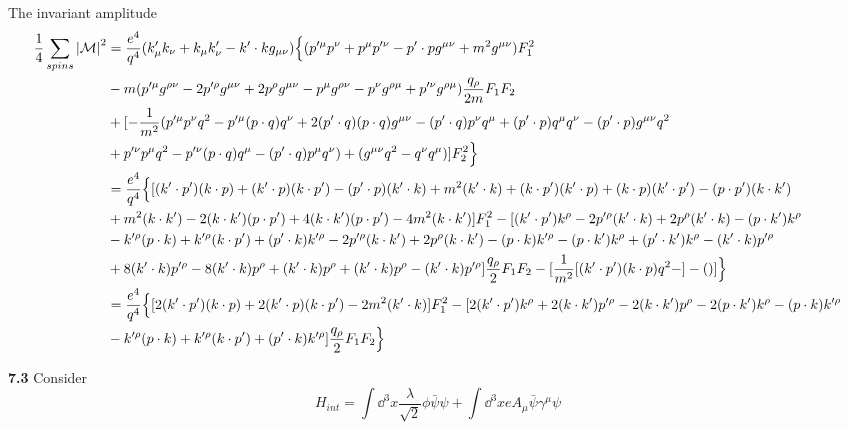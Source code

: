 \documentclass{article}
\newcommand{\gm}{\gamma^{\mu}} \newcommand{\gn}{\gamma^{\nu}}
\newcommand{\la}{\lambda} \newcommand{\p}{\phi} \newcommand{\vp}{\varphi}
\begin{document}
The invariant amplitude
\begin{align*}
  \frac{1}{4}\sum_{spins}\abs{\mathcal{M}}^2&=\frac{e^4}{q^4}(k'_{\mu}k_{\nu}+k_{\mu}k'_{\nu}-k'\cdot kg_{\mu\nu})\Big\{(p'^{\mu}p^{\nu}+p^{\mu}p'^{\nu}-p'\cdot pg^{\mu\nu}+m^2g^{\mu\nu})F_1^2\\
  &-m(p'^{\mu}g^{\rho\nu}-2p'^{\rho}g^{\mu\nu}+2p^{\rho}g^{\mu\nu}-p^{\mu}g^{\rho\nu}-p^{\nu}g^{\rho\mu}+p'^{\nu}g^{\rho\mu})\frac{q_{\rho}}{2m}F_1F_2\\&+[-\frac{1}{m^2}(p'^{\mu}p^{\nu}q^2-p'^{\mu}(p\cdot q)q^{\nu}+2(p'\cdot q)(p\cdot q)g^{{\mu}{\nu}}-(p'\cdot q)p^{\nu}q^{\mu}+(p'\cdot p)q^{\mu}q^{\nu}-(p'\cdot p)g^{{\mu}{\nu}}q^2\\&+p'^{\nu}p^{\mu}q^2-p'^{\nu}(p\cdot q)q^{\mu}-(p'\cdot q)p^{\mu}q^{\nu})+(g^{\mu\nu}q^2-q^{\nu}q^{\mu})]F_2^2\Big\}\\
  &=\frac{e^4}{q^4}\Big\{ [(k'\cdot p')(k\cdot p)+(k'\cdot p)(k\cdot p')-(p'\cdot p)(k'\cdot k)+m^2(k'\cdot k)+(k\cdot p')(k'\cdot p)+(k\cdot p)(k'\cdot p')-(p\cdot p')(k\cdot k')\\&+m^2(k\cdot k')-2(k\cdot k')(p\cdot p')+4(k\cdot k')(p\cdot p')-4m^2(k\cdot k')]F_1^2-[(k'\cdot p')k^{\rho}-2p'^{\rho}(k'\cdot k)+2p^{\rho}(k'\cdot k)-(p\cdot k')k^{\rho}\\
  &-k'^{\rho}(p\cdot k)+k'^{\rho}(k\cdot p')+(p'\cdot k)k'^{\rho}-2p'^{\rho}(k\cdot k')+2p^{\rho}(k\cdot k')-(p\cdot k)k'^{\rho}-(p\cdot k')k^{\rho}+(p'\cdot k')k^{\rho}-(k'\cdot k)p'^{\rho}\\
  &+8(k'\cdot k)p'^{\rho}-8(k'\cdot k)p^{\rho}+(k'\cdot k)p^{\rho}+(k'\cdot k)p^{\rho}-(k'\cdot k)p'^{\rho}]\frac{q_{\rho}}{2}F_1F_2-[\frac{1}{m^2}[(k'\cdot p')(k\cdot p)q^2-]-()]   \Big\}\\
  &=\frac{e^4}{q^4}\Big\{ [2(k'\cdot p')(k\cdot p)+2(k'\cdot p)(k\cdot p')-2m^2(k'\cdot k)]F_1^2-[2(k'\cdot p')k^{\rho}+2(k\cdot k')p'^{\rho}-2(k\cdot k')p^{\rho}-2(p\cdot k' )k^{\rho}-(p\cdot k)k'^{\rho}\\
  &-k'^{\rho}(p\cdot k)+k'^{\rho}(k\cdot p')+(p'\cdot k)k'^{\rho}]\frac{q_{\rho}}{2}F_1F_2   \Big\}
\end{align*}

{\bf7.3}\quad
Consider
$$H_{int}=\int\dd^3x\frac{\la}{\sqrt{2}} \phi\bar\psi\psi+\int\dd^3xeA_{\mu}\bar\psi\gm\psi$$
\end{document}
